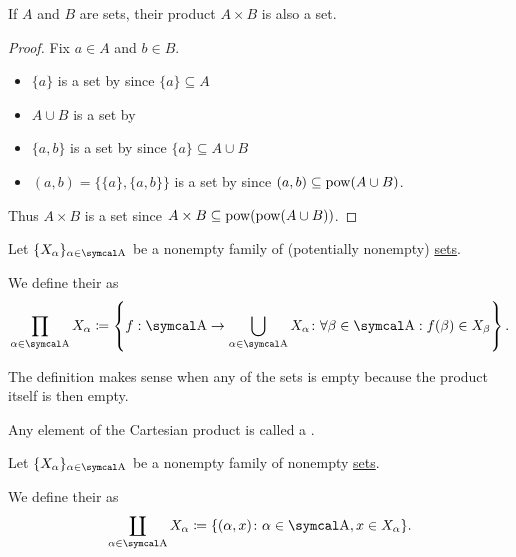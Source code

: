 \begin{proposition}\label{def:binary_cartesian_product_is_set}
  If \( A \) and \( B \) are sets, their product \( A \times B \) is also a set.
\end{proposition}
\begin{proof}
  Fix \( a \in A \) and \( b \in B \).
  \begin{itemize}
    \item \( \{ a \} \) is a set by  since \( \{ a \} \subseteq A \)
    \item \( A \cup B \) is a set by 
    \item \( \{ a, b \} \) is a set by  since \( \{ a \} \subseteq A \cup B \)
    \item \( (a, b) = \{ \{ a \}, \{ a, b \} \} \) is a set by  since \( (a, b) \subseteq \operatorname{pow}(A \cup B) \).
  \end{itemize}

  Thus \( A \times B \) is a set since \( A \times B \subseteq \operatorname{pow}(\operatorname{pow}(A \cup B)) \).
\end{proof}

\begin{definition}\label{def:cartesian_product}\cite[54]{Enderton1977}
  Let \( \{ X_\al \}_{\al \in \CA} \) be a nonempty family of (potentially nonempty) \hyperref[def:indexed_family]{sets}.

  We define their  as
  \begin{equation*}
    \prod_{\al \in \CA} X_\al \coloneqq \left\{ f: \CA \to \bigcup_{\al \in \CA} X_\al \colon \forall \beta \in \CA: f(\beta) \in X_\beta \right\}.
  \end{equation*}

  The definition makes sense when any of the sets is empty because the product itself is then empty.

  Any element of the Cartesian product is called a .
\end{definition}

\begin{definition}\label{def:disjoint_union}
  Let \( \{ X_\al \}_{\al \in \CA} \) be a nonempty family of nonempty \hyperref[def:indexed_family]{sets}.

  We define their  as
  \begin{equation*}
    \coprod_{\al \in \CA} X_\al \coloneqq \{ (\al, x) \colon \al \in \CA, x \in X_\al \}.
  \end{equation*}
\end{definition}

